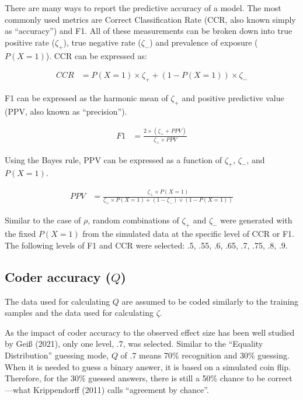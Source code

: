 \documentclass[english,man,floatsintext]{apa6}
\begin{document}
There are many ways to report the predictive accuracy of a model. The most commonly used metrics are Correct Classification Rate (CCR, also known simply as \enquote{accuracy}) and F1. All of these measurements can be broken down into true positive rate (\(\zeta_{+}\)), true negative rate (\(\zeta_{-}\)) and prevalence of exposure (\(P(X = 1)\)). CCR can be expressed as:

\begin{align}
  CCR &= P(X = 1) \times \zeta_{+} + (1 - P(X = 1)) \times \zeta_{-}
\end{align}

F1 can be expressed as the harmonic mean of \(\zeta_{+}\) and positive predictive value (PPV, also known as \enquote{precision}).

\begin{align}
  \label{eq:ppv}
  F1 &= \frac{2 \times (\zeta_{+} + PPV)}{\zeta_{+} \times PPV}
\end{align}

Using the Bayes rule, PPV can be expressed as a function of \(\zeta_{+}\), \(\zeta_{-}\), and \(P(X = 1)\).

\begin{align}
  PPV &= \frac{\zeta_{+} \times P(X = 1)}{\zeta_{+} \times P(X = 1) + (1 - \zeta_{-}) \times (1 - P(X = 1))}
\end{align}

Similar to the case of \(\rho\), random combinations of \(\zeta_{+}\) and \(\zeta_{-}\) were generated with the fixed \(P(X = 1)\) from the simulated data at the specific level of CCR or F1. The following levels of F1 and CCR were selected: .5, .55, .6, .65, .7, .75, .8, .9.

\hypertarget{coder-accuracy-q}{%
\subsection{\texorpdfstring{Coder accuracy (\(Q\))}{Coder accuracy (Q)}}\label{coder-accuracy-q}}

The data used for calculating \(Q\) are assumed to be coded similarly to the training samples and the data used for calculating \(\zeta\).

As the impact of coder accuracy to the observed effect size has been well studied by Geiß (2021), only one level, .7, was selected. Similar to the \enquote{Equality Distribution} guessing mode, \(Q\) of .7 means 70\% recognition and 30\% guessing. When it is needed to guess a binary answer, it is based on a simulated coin flip. Therefore, for the 30\% guessed answers, there is still a 50\% chance to be correct ---what Krippendorff (2011) calls \enquote{agreement by chance}.
\end{document}
